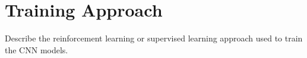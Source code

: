 \section{Training Approach}

\begin{outline}
  Describe the reinforcement learning or supervised learning approach used to train the CNN models.
\end{outline}
